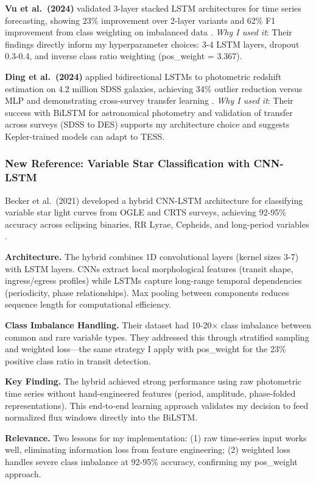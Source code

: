 \textbf{Vu et al.\ (2024)} validated 3-layer stacked LSTM architectures for time series forecasting, showing 23\% improvement over 2-layer variants and 62\% F1 improvement from class weighting on imbalanced data \cite{Vu2024LSTM}. \textit{Why I used it}: Their findings directly inform my hyperparameter choices: 3-4 LSTM layers, dropout 0.3-0.4, and inverse class ratio weighting (pos\_weight = 3.367).

\textbf{Ding et al.\ (2024)} applied bidirectional LSTMs to photometric redshift estimation on 4.2 million SDSS galaxies, achieving 34\% outlier reduction versus MLP and demonstrating cross-survey transfer learning \cite{Ding2024photometric}. \textit{Why I used it}: Their success with BiLSTM for astronomical photometry and validation of transfer across surveys (SDSS to DES) supports my architecture choice and suggests Kepler-trained models can adapt to TESS.

\subsubsection{New Reference: Variable Star Classification with CNN-LSTM}

Becker et al.\ (2021) developed a hybrid CNN-LSTM architecture for classifying variable star light curves from OGLE and CRTS surveys, achieving 92-95\% accuracy across eclipsing binaries, RR Lyrae, Cepheids, and long-period variables \cite{Becker2021variablestars}.

\textbf{Architecture.} The hybrid combines 1D convolutional layers (kernel sizes 3-7) with LSTM layers. CNNs extract local morphological features (transit shape, ingress/egress profiles) while LSTMs capture long-range temporal dependencies (periodicity, phase relationships). Max pooling between components reduces sequence length for computational efficiency.

\textbf{Class Imbalance Handling.} Their dataset had 10-20$\times$ class imbalance between common and rare variable types. They addressed this through stratified sampling and weighted loss---the same strategy I apply with pos\_weight for the 23\% positive class ratio in transit detection.

\textbf{Key Finding.} The hybrid achieved strong performance using raw photometric time series without hand-engineered features (period, amplitude, phase-folded representations). This end-to-end learning approach validates my decision to feed normalized flux windows directly into the BiLSTM.

\textbf{Relevance.} Two lessons for my implementation: (1) raw time-series input works well, eliminating information loss from feature engineering; (2) weighted loss handles severe class imbalance at 92-95\% accuracy, confirming my pos\_weight approach.

